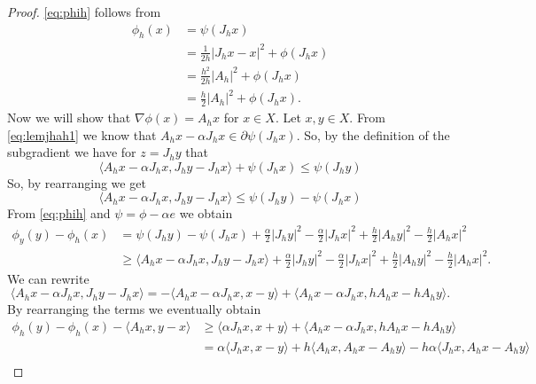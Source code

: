 \documentclass[a4paper,11pt, leqno]{scrreprt} %
\renewcommand{\leq}{\leqslant}
\renewcommand{\leq}{\leqslant}
\renewcommand{\geq}{\geqslant}
\theoremstyle{change}
\theoremstyle{nonumberplain}
\newtheorem{proof}{Proof}
\begin{document}
\begin{proof}
\eqref{eq:phih} follows from
\begin{equation*}
\begin{split}
\phi_h(x) &= \psi(J_h x)\\
&=\frac1{2h} |J_h x - x|^2 + \phi(J_h x)\\
&=\frac{h^2}{2h} |A_h|^2 + \phi(J_h x)\\
&=\frac{h}{2} |A_h|^2 + \phi(J_h x).
\end{split}
\end{equation*}
Now we will show that $\nabla \phi(x) = A_h x$ for $x \in X$. Let
$x,y \in X$. From \eqref{eq:lemjhah1} we know that $A_h x - \alpha J_h
x \in \partial \psi(J_h x)$. So, by the definition of the subgradient
we have for $z = J_h y$ that
\begin{equation*}
\langle A_h x - \alpha J_h x, J_h y - J_h x \rangle  + \psi(J_h x) \leq
\psi(J_h y)
\end{equation*}
So, by rearranging we get
\begin{equation*}
\langle A_h x - \alpha J_h x, J_h y - J_h x \rangle  \leq \psi(J_h y) -
\psi(J_h x)
\end{equation*}
From \eqref{eq:phih} and $\psi = \phi - \alpha e$ we obtain
\begin{equation*}
\begin{split}
\phi_y(y) - \phi_h(x) &= \psi(J_h y) - \psi(J_h x) + \frac{\alpha}2
|J_h y|^2 - \frac{\alpha}2 |J_h x|^2 + \frac{h}2 |A_h y|^2 - \frac{h}2
|A_h x|^2\\
&\geq \langle A_h x - \alpha J_h x, J_h y - J_h x \rangle + \frac{\alpha}2
|J_h y|^2 - \frac{\alpha}2 |J_h x|^2 + \frac{h}2 |A_h y|^2 - \frac{h}2
|A_h x|^2.
\end{split}
\end{equation*}
We can rewrite
\begin{equation}
\langle A_h x - \alpha J_h x, J_h y - J_h x \rangle = -\langle A_h x -
\alpha J_h x, x - y \rangle + \langle A_h x - \alpha J_h x, h A_h x -
h A_h y \rangle.
\end{equation}
By rearranging the terms we eventually obtain
\begin{align*}
\phi_h(y) - \phi_h(x) - \langle A_h x, y - x \rangle &\geq \langle
\alpha J_h x, x + y \rangle + \langle A_h x - \alpha J_h x, h A_h x -
h A_h y \rangle\\
&=\alpha \langle J_h x, x - y\rangle + h \langle A_h x, A_h x - A_h y
\rangle - h \alpha \langle J_h x, A_h x - A_h y \rangle\\

\end{align*}
\end{proof}
\end{document}
